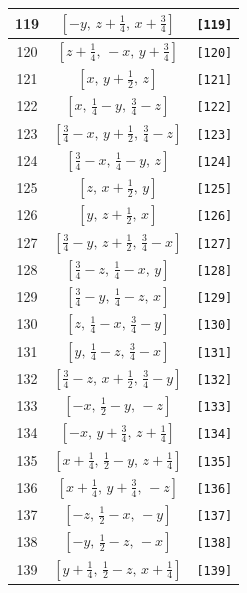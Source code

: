 \documentclass[fleqn,8pt]{jsarticle}
\begin{document}
\begin{longtable}{ccc}
119 & $\left[ - y,\, z + \frac{1}{4},\, x + \frac{3}{4} \right]$ & {\tt [119]} \\ \hline
120 & $\left[ z + \frac{1}{4},\, - x,\, y + \frac{3}{4} \right]$ & {\tt [120]} \\ \hline
121 & $\left[ x,\, y + \frac{1}{2},\, z \right]$ & {\tt [121]} \\ \hline
122 & $\left[ x,\, \frac{1}{4} - y,\, \frac{3}{4} - z \right]$ & {\tt [122]} \\ \hline
123 & $\left[ \frac{3}{4} - x,\, y + \frac{1}{2},\, \frac{3}{4} - z \right]$ & {\tt [123]} \\ \hline
124 & $\left[ \frac{3}{4} - x,\, \frac{1}{4} - y,\, z \right]$ & {\tt [124]} \\ \hline
125 & $\left[ z,\, x + \frac{1}{2},\, y \right]$ & {\tt [125]} \\ \hline
126 & $\left[ y,\, z + \frac{1}{2},\, x \right]$ & {\tt [126]} \\ \hline
127 & $\left[ \frac{3}{4} - y,\, z + \frac{1}{2},\, \frac{3}{4} - x \right]$ & {\tt [127]} \\ \hline
128 & $\left[ \frac{3}{4} - z,\, \frac{1}{4} - x,\, y \right]$ & {\tt [128]} \\ \hline
129 & $\left[ \frac{3}{4} - y,\, \frac{1}{4} - z,\, x \right]$ & {\tt [129]} \\ \hline
130 & $\left[ z,\, \frac{1}{4} - x,\, \frac{3}{4} - y \right]$ & {\tt [130]} \\ \hline
131 & $\left[ y,\, \frac{1}{4} - z,\, \frac{3}{4} - x \right]$ & {\tt [131]} \\ \hline
132 & $\left[ \frac{3}{4} - z,\, x + \frac{1}{2},\, \frac{3}{4} - y \right]$ & {\tt [132]} \\ \hline
133 & $\left[ - x,\, \frac{1}{2} - y,\, - z \right]$ & {\tt [133]} \\ \hline
134 & $\left[ - x,\, y + \frac{3}{4},\, z + \frac{1}{4} \right]$ & {\tt [134]} \\ \hline
135 & $\left[ x + \frac{1}{4},\, \frac{1}{2} - y,\, z + \frac{1}{4} \right]$ & {\tt [135]} \\ \hline
136 & $\left[ x + \frac{1}{4},\, y + \frac{3}{4},\, - z \right]$ & {\tt [136]} \\ \hline
137 & $\left[ - z,\, \frac{1}{2} - x,\, - y \right]$ & {\tt [137]} \\ \hline
138 & $\left[ - y,\, \frac{1}{2} - z,\, - x \right]$ & {\tt [138]} \\ \hline
139 & $\left[ y + \frac{1}{4},\, \frac{1}{2} - z,\, x + \frac{1}{4} \right]$ & {\tt [139]} \\ \hline

\end{longtable}
\end{document}
